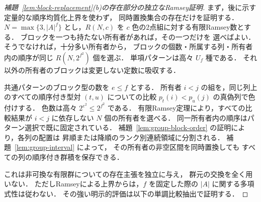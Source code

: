 \begin{proof}[補題~\ref{lem:block-replacement}(b)の存在部分の独立なRamsey証明]
まず，後に示す定量的な順序均質化上界を使わず，
同時置換集合の存在だけを証明する．
$N=\max\{3,|A|^f\}$ とし，$R(N,c)$ を
$c$ 色の2点組に対する有限Ramsey数とする．
ブロックを一つも持たない所有者があれば，その一つだけを
選べばよい．そうでなければ，十分多い所有者から，
ブロックの個数・所属する列・所有者内の順序が同じ
$R(N,2^{f^2})$ 個を選ぶ．
単項パターンは高々 $U_f$ 種である．
それ以外の所有者のブロックは変更しない定数に吸収する．

共通パターンのブロック型の数を $e\le f$ とする．
所有者 $i<j$ の組を，同じ列上のすべての順序付き型対
$(t,u)$ についての比較 $p_t(i)<p_u(j)$ の真偽列で色付けする．
色数は高々 $2^{e^2}\le2^{f^2}$ である．
有限Ramsey定理により，すべての比較結果が
$i<j$ に依存しない $N$ 個の所有者を選べる．
同一所有者内の順序はパターン選択で既に固定されている．
補題~\ref{lem:group-block-order} の証明により，各列の配置は
昇順または降順のランク別連続領域に分割される．
補題~\ref{lem:group-interval} によって，
その所有者の非空区間を同時置換しても
すべての列の順序付き群積を保存できる．

これは非可換な有限群についての存在主張を独立に与え，
群元の交換を全く用いない．
ただしRamseyによる上界からは，$f$ を固定した際の
$|A|$ に関する多項式性は従わない．
その強い明示的評価は以下の単調比較抽出で証明する．
\end{proof}

